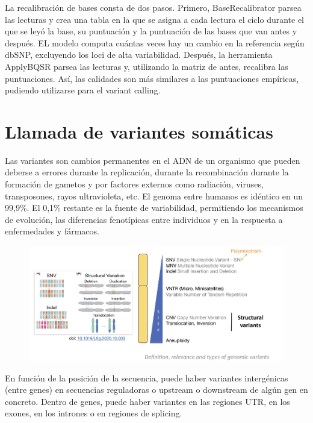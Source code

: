 La recalibración de bases consta de dos pasos. Primero, BaseRecalibrator parsea las lecturas y crea una tabla en la que se asigna a cada lectura el ciclo durante el que se leyó la base, su puntuación y la puntuación de las bases que van antes y después. EL modelo computa cuántas veces hay un cambio en la referencia según dbSNP, excluyendo los loci de alta variabilidad. Después, la herramienta ApplyBQSR parsea las lecturas y, utilizando la matriz de antes, recalibra las puntuaciones. Así, las calidades son más similares a las puntuaciones empíricas, pudiendo utilizarse para el variant calling.

\section{Llamada de variantes somáticas}
Las variantes son cambios permanentes en el ADN de un organismo que pueden deberse a errores durante la replicación, durante la recombinación durante la formación de gametos y por factores externos como radiación, viruses, transposones, rayos ultravioleta, etc. El genoma entre humanos es idéntico en un 99,9\%. El 0,1\% restante es la fuente de variabilidad, permitiendo los mecanismos de evolución, las diferencias fenotípicas entre individuos y en la respuesta a enfermedades y fármacos. 

\begin{figure}[htbp]
\centering
\includegraphics[width = \textwidth]{figs/variants-size.png}
\end{figure}

En función de la posición de la secuencia, puede haber variantes intergénicas (entre genes) en secuencias reguladoras o upstream o downstream de algún gen en concreto. Dentro de genes, puede haber variantes en las regiones UTR, en los exones, en los intrones o en regiones de splicing. 

